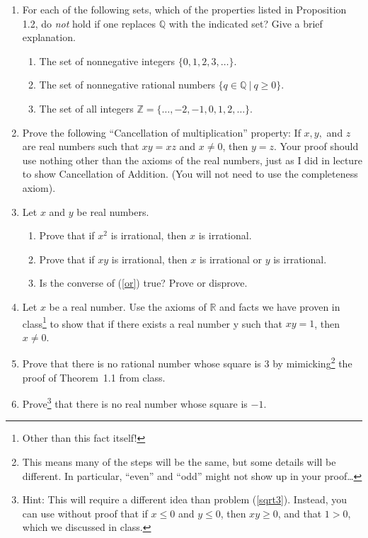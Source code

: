\documentclass{amsart}
\def\R{\mathbb R}
\def\Q{\mathbb Q}
\def\Z{\mathbb Z}
\begin{document}
\begin{enumerate}
\item For each of the following sets, which of the properties listed in Proposition 1.2, do \emph{not} hold if one replaces $\mathbb{Q}$ with the indicated set? Give a brief explanation. 
\begin{enumerate}
\item The set of nonnegative integers $\{0, 1, 2, 3, \dots\}$.
\item The set of nonnegative rational numbers $\{q \in \Q \ | \ q \geq 0\}$.
\item The set of all integers $\Z = \{\dots,-2,-1,0,1,2,\dots\}$.
\end{enumerate}
\item Prove the following ``Cancellation of multiplication'' property: If $x, y,$ and $z$ are real numbers such that $xy = xz$ and $x\neq 0$, then $y = z$. Your proof should use nothing other than the axioms of the real numbers, just as I did in lecture to show Cancellation of Addition. (You will not need to use the completeness axiom).
\item Let $x$ and $y$ be real numbers. 
\begin{enumerate}
\item Prove that if $x^2$ is irrational, then $x$ is irrational.
\item\label{or} Prove that if $xy$ is irrational, then $x$ is irrational or $y$ is irrational.
\item Is the converse of (\ref{or}) true? Prove or disprove.
\end{enumerate}
\item Let $x$ be a real number. Use the axioms of $\R$ and facts we have proven in class\footnote{Other than this fact itself!} to show that if there exists a real number y such that $xy = 1$, then $x\neq 0$.
\item\label{sqrt3} Prove that there is no rational number whose square is 3 by mimicking\footnote{This means many of the steps will be the same, but some details will be different. In particular, ``even'' and ``odd'' might not show up in your proof\dots} the proof of Theorem~1.1 from class.
\item Prove\footnote{Hint: This will require a different idea than problem (\ref{sqrt3}). Instead, you can use without proof that if $x\leq 0$ and $y\leq 0$, then $xy\geq 0$, and that $1>0$, which we discussed in class.} that there is no real number whose square is $-1$.
\end{enumerate}
\end{document}
